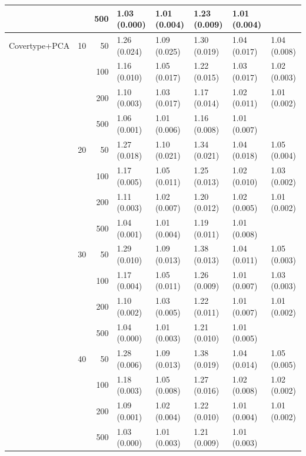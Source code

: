\begin{longtable}{p{}lrlllll}
      &     & 500 &   1.03 (0.000) &   1.01 (0.004) &   1.23 (0.009) &         1.01 (0.004) &            \\
\midrule
Covertype+PCA & 10  & 50  &   1.26 (0.024) &   1.09 (0.025) &   1.30 (0.019) &         1.04 (0.017) &  1.04 (0.008) \\
      &     & 100 &   1.16 (0.010) &   1.05 (0.017) &   1.22 (0.015) &         1.03 (0.017) &  1.02 (0.003) \\
      &     & 200 &   1.10 (0.003) &   1.03 (0.017) &   1.17 (0.014) &         1.02 (0.011) &  1.01 (0.002) \\
      &     & 500 &   1.06 (0.001) &   1.01 (0.006) &   1.16 (0.008) &         1.01 (0.007) &            \\
      & 20  & 50  &   1.27 (0.018) &   1.10 (0.021) &   1.34 (0.021) &         1.04 (0.018) &  1.05 (0.004) \\
      &     & 100 &   1.17 (0.005) &   1.05 (0.011) &   1.25 (0.013) &         1.02 (0.010) &  1.03 (0.002) \\
      &     & 200 &   1.11 (0.003) &   1.02 (0.007) &   1.20 (0.012) &         1.02 (0.005) &  1.01 (0.002) \\
      &     & 500 &   1.04 (0.001) &   1.01 (0.004) &   1.19 (0.011) &         1.01 (0.008) &            \\
      & 30  & 50  &   1.29 (0.010) &   1.09 (0.013) &   1.38 (0.013) &         1.04 (0.011) &  1.05 (0.003) \\
      &     & 100 &   1.17 (0.004) &   1.05 (0.011) &   1.26 (0.009) &         1.01 (0.007) &  1.03 (0.003) \\
      &     & 200 &   1.10 (0.002) &   1.03 (0.005) &   1.22 (0.011) &         1.01 (0.007) &  1.01 (0.002) \\
      &     & 500 &   1.04 (0.000) &   1.01 (0.003) &   1.21 (0.010) &         1.01 (0.005) &            \\
      & 40  & 50  &   1.28 (0.006) &   1.09 (0.013) &   1.38 (0.019) &         1.04 (0.014) &  1.05 (0.005) \\
      &     & 100 &   1.18 (0.003) &   1.05 (0.008) &   1.27 (0.016) &         1.02 (0.008) &  1.02 (0.002) \\
      &     & 200 &   1.09 (0.001) &   1.02 (0.004) &   1.22 (0.010) &         1.01 (0.004) &  1.01 (0.002) \\
      &     & 500 &   1.03 (0.000) &   1.01 (0.003) &   1.21 (0.009) &         1.01 (0.003) &            \\

\end{longtable}
